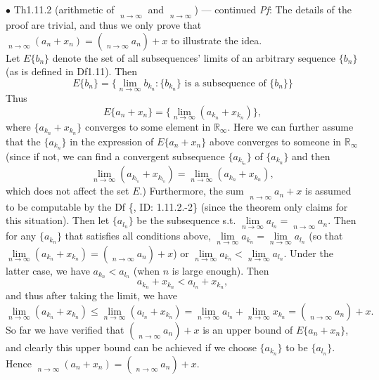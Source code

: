 \documentclass{article}
\begin{document}
\begin{Th}{$\bullet$ Th1.11.2 (arithmetic of $\mathop{\overline{\lim}}\limits_{n\to\infty}$ and $\mathop{\underline{\lim}}\limits_{n\to\infty}$) —  continued}
    \textit{Pf}: The details of the proof are trivial, and thus we only prove that $\mathop{\overline{\lim}}\limits_{n\to\infty}(a_n + x_n) = \left(\mathop{\overline{\lim}}\limits_{n\to\infty}a_n\right) + x$ to illustrate the idea. \\
    Let $E\{b_n\}$ denote the set of all subsequences' limits of an arbitrary sequence $\{b_n\}$ (as is defined in Df1.11). Then
    $$ E\{b_n\} = \{\lim\limits_{n\to\infty}b_{k_n}: \{b_{k_n}\}\text{ is a subsequence of }\{b_n\}\} $$
    Thus 
    $$ E\{a_n+x_n\} = \{\lim\limits_{n\to\infty}(a_{k_n}+x_{k_n})\}, $$
    where $\{a_{k_n}+x_{k_n}\}$ converges to some element in $\mathbb{R}_\infty$. Here we can further assume that the $\{a_{k_n}\}$ in the expression of $E\{a_n+x_n\}$ above converges to someone in $\mathbb{R}_\infty$ (since if not, we can find a convergent subsequence $\{a_{k_{l_n}}\}$ of $\{a_{k_n}\}$ and then
    $$ \lim\limits_{n\to\infty}(a_{k_{l_n}}+x_{k_{l_n}}) = \lim\limits_{n\to\infty}(a_{k_n} + x_{k_n}), $$
    which does not affect the set $E$.) Furthermore, the sum $\mathop{\overline{\lim}}\limits_{n\to\infty}a_n + x$ is assumed to be computable by the Df \{, ID: 1.11.2.-2\} (since the theorem only claims for this situation). Then let $\{a_{l_n}\}$ be the subsequence s.t. $\lim\limits_{n\to\infty}a_{l_n} = \mathop{\overline{\lim}}\limits_{n\to\infty}a_n$. Then for any $\{a_{k_n}\}$ that satisfies all conditions above, $\lim\limits_{n\to\infty}a_{k_n} = \lim\limits_{n\to\infty}a_{l_n}$ (so that $\lim\limits_{n\to\infty}(a_{k_n} + x_{k_n}) = \left(\mathop{\overline{\lim}}\limits_{n\to\infty}a_n\right) + x$) or $\lim\limits_{n\to\infty}a_{k_n} < \lim\limits_{n\to\infty}a_{l_n}$. Under the latter case, we have $a_{k_n} < a_{l_n}$ (when $n$ is large enough). Then
    $$ a_{k_n} + x_{k_n} < a_{l_n} + x_{k_n}, $$
    and thus after taking the limit, we have
    $$ \lim\limits_{n\to\infty}(a_{k_n} + x_{k_n}) \leq \lim\limits_{n\to\infty}(a_{l_n} + x_{k_n}) = \lim\limits_{n\to\infty}a_{l_n} + \lim\limits_{n\to\infty}x_{k_n} = \left(\mathop{\overline{\lim}}\limits_{n\to\infty}a_n\right) + x. $$
    So far we have verified that $\left(\mathop{\overline{\lim}}\limits_{n\to\infty}a_n\right)+x$ is an upper bound of $E\{a_n+x_n\}$, and clearly this upper bound can be achieved if we choose $\{a_{k_n}\}$ to be $\{a_{l_n}\}$. Hence $\mathop{\overline{\lim}}\limits_{n\to\infty}(a_n+x_n) = \left(\mathop{\overline{\lim}}\limits_{n\to\infty}a_n\right) + x$.
\end{Th}
\end{document}
